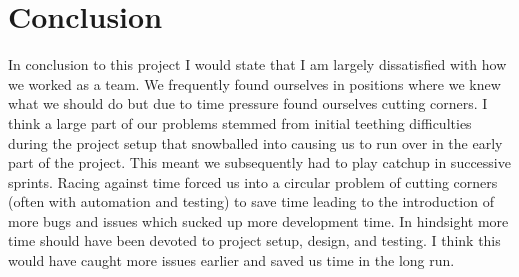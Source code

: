 \documentclass[paper=a4, fontsize=11pt]{scrartcl}	%
\numberwithin{equation}{section}															%
\numberwithin{figure}{section}																%
\numberwithin{table}{section}
\begin{document}
\section*{Conclusion} 

In conclusion to this project I would state that I am largely dissatisfied with how we worked as a team. We frequently found ourselves in positions where we knew what we should do but due to time pressure found ourselves cutting corners. I think a large part of our problems stemmed from initial teething difficulties during the project setup that snowballed into causing us to run over in the early part of the project. This meant we subsequently had to play catchup in successive sprints. Racing against time forced us into a circular problem of cutting corners (often with automation and testing) to save time leading to the introduction of more bugs and issues which sucked up more development time. In hindsight more time should have been devoted to project setup, design, and testing. I think this would have caught more issues earlier and saved us time in the long run.
\end{document}
